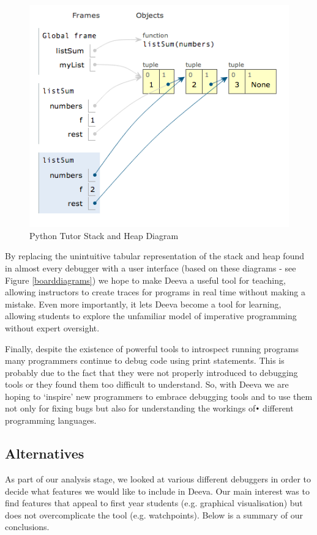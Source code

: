 \documentclass[11pt, a4paper]{article}
\begin{document}
\begin{figure}[h!]
\centering
\includegraphics[width=125mm]{PythonTutorStackHeap.png}
\caption{Python Tutor Stack and Heap Diagram}
\end{figure}

By replacing the unintuitive tabular representation of the stack and heap found in almost every debugger with a user interface (based on these diagrams - see Figure \ref{boarddiagrams}) we hope to make Deeva a useful tool for teaching,
allowing instructors to create traces for programs in real time without making a mistake.
Even more importantly, it lets Deeva become a tool for learning, allowing students to explore the unfamiliar model of imperative programming without expert oversight.

Finally, despite the existence of powerful tools to introspect running programs many programmers continue to debug code using print statements.
This is probably due to the fact that they were not properly introduced to debugging tools or they found them too difficult to understand. So, with Deeva we are hoping to `inspire' new programmers to embrace debugging tools and to use them not only  for fixing bugs but also for understanding the workings of\texttt{•} different programming languages.

\subsection{Alternatives}
As part of our analysis stage, we looked at various different debuggers in order to decide what features we would like to include in Deeva. Our main interest was to find features that appeal to first year students (e.g. graphical visualisation) but does not overcomplicate the tool (e.g. watchpoints).
Below is a summary of our conclusions.
\end{document}
